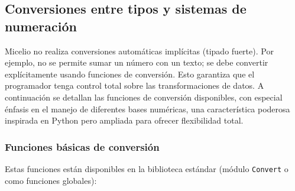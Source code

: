 \documentclass[12pt]{article}
\begin{document}
\subsection{Conversiones entre tipos y sistemas de numeración}

Micelio no realiza conversiones automáticas implícitas (tipado fuerte). Por ejemplo, no se permite sumar un número con un texto; se debe convertir explícitamente usando funciones de conversión. Esto garantiza que el programador tenga control total sobre las transformaciones de datos. A continuación se detallan las funciones de conversión disponibles, con especial énfasis en el manejo de diferentes bases numéricas, una característica poderosa inspirada en Python pero ampliada para ofrecer flexibilidad total.

\subsubsection{Funciones básicas de conversión}

Estas funciones están disponibles en la biblioteca estándar (módulo \texttt{Convert} o como funciones globales):
\end{document}
